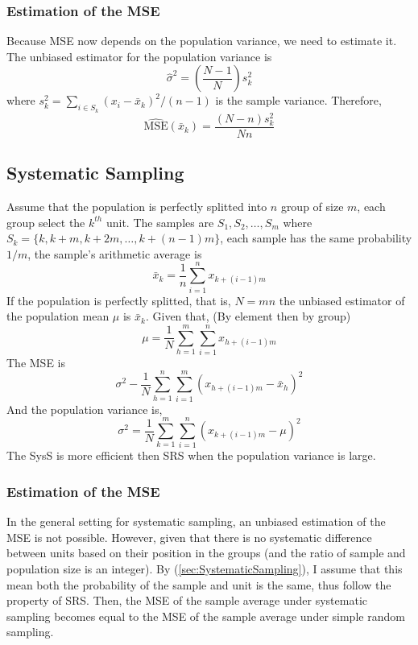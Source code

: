 \subsubsection{Estimation of the MSE}
Because MSE now depends on the population variance, we need to estimate it. The unbiased estimator for the population variance is 
\begin{equation}
    \hat{\sigma}^2=\left(\frac{N-1}{N}\right)s^2_k
\end{equation}
where $s^2_k=\sum_{i\in S_k}(x_i-\bar{x}_k)^2/(n-1)$ is the sample variance. Therefore,
\begin{equation}
    \hat{\mathrm{MSE}}(\bar{x}_k)=\frac{(N-n)s^2_k}{Nn}
\end{equation}

\subsection{Systematic Sampling}
Assume that the population is perfectly splitted into $n$ group of size $m$, each group select the $k^{th}$ unit. The samples are $S_1,S_2,\ldots,S_m$ where $S_k=\{k,k+m,k+2m,\ldots,k+(n-1)m\}$, each sample has the same
probability $1/m$, the sample's arithmetic average is
\begin{equation}
    \bar{x}_k=\frac1n\sum_{i=1}^{n}x_{k+(i-1)m}
\end{equation}
If the population is perfectly splitted, that is, $N=mn$ the unbiased estimator of the population mean $\mu$ is $\bar{x}_k$. Given that, (By element then by group)
\begin{equation}
    \mu=\frac1N\sum_{h=1}^{m}\sum_{i=1}^{n}x_{h+(i-1)m}
\end{equation}
The MSE is
\begin{equation}
    \sigma^2-\frac1N\sum_{h=1}^{n}\sum_{i=1}^{m}\left(x_{h+(i-1)m}-\bar{x}_h\right)^2
\end{equation}
And the population variance is, 
\begin{equation}
    \sigma^2=\frac1N\sum_{k=1}^{m}\sum_{i=1}^{n}\left(x_{k+(i-1)m}-\mu\right)^2
\end{equation}
The SysS is more efficient then SRS when the population variance is large.
\subsubsection{Estimation of the MSE}
In the general setting for systematic sampling, an unbiased estimation of the MSE is not possible. However, given that there is no systematic difference between units based on their position in the groups (and the ratio
of sample and population size is an integer). By (\cref{sec:SystematicSampling}), I assume that this mean both the probability of the sample and unit is the same, thus follow the property of SRS. Then, the MSE of the sample 
average under systematic sampling becomes equal to the MSE of the sample average under simple random sampling.

